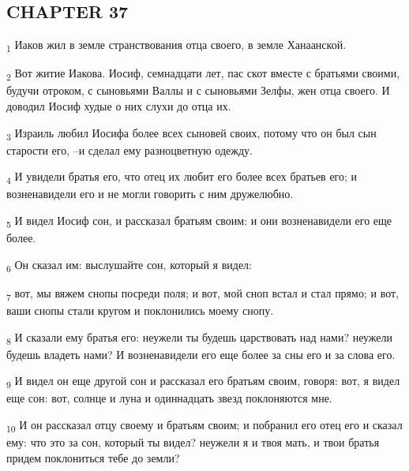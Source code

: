 \subsection{CHAPTER 37}
\begin{tcolorbox}
\textsubscript{1} Иаков жил в земле странствования отца своего, в земле Ханаанской.
\end{tcolorbox}
\begin{tcolorbox}
\textsubscript{2} Вот житие Иакова. Иосиф, семнадцати лет, пас скот вместе с братьями своими, будучи отроком, с сыновьями Валлы и с сыновьями Зелфы, жен отца своего. И доводил Иосиф худые о них слухи до отца их.
\end{tcolorbox}
\begin{tcolorbox}
\textsubscript{3} Израиль любил Иосифа более всех сыновей своих, потому что он был сын старости его, --и сделал ему разноцветную одежду.
\end{tcolorbox}
\begin{tcolorbox}
\textsubscript{4} И увидели братья его, что отец их любит его более всех братьев его; и возненавидели его и не могли говорить с ним дружелюбно.
\end{tcolorbox}
\begin{tcolorbox}
\textsubscript{5} И видел Иосиф сон, и рассказал братьям своим: и они возненавидели его еще более.
\end{tcolorbox}
\begin{tcolorbox}
\textsubscript{6} Он сказал им: выслушайте сон, который я видел:
\end{tcolorbox}
\begin{tcolorbox}
\textsubscript{7} вот, мы вяжем снопы посреди поля; и вот, мой сноп встал и стал прямо; и вот, ваши снопы стали кругом и поклонились моему снопу.
\end{tcolorbox}
\begin{tcolorbox}
\textsubscript{8} И сказали ему братья его: неужели ты будешь царствовать над нами? неужели будешь владеть нами? И возненавидели его еще более за сны его и за слова его.
\end{tcolorbox}
\begin{tcolorbox}
\textsubscript{9} И видел он еще другой сон и рассказал его братьям своим, говоря: вот, я видел еще сон: вот, солнце и луна и одиннадцать звезд поклоняются мне.
\end{tcolorbox}
\begin{tcolorbox}
\textsubscript{10} И он рассказал отцу своему и братьям своим; и побранил его отец его и сказал ему: что это за сон, который ты видел? неужели я и твоя мать, и твои братья придем поклониться тебе до земли?
\end{tcolorbox}
